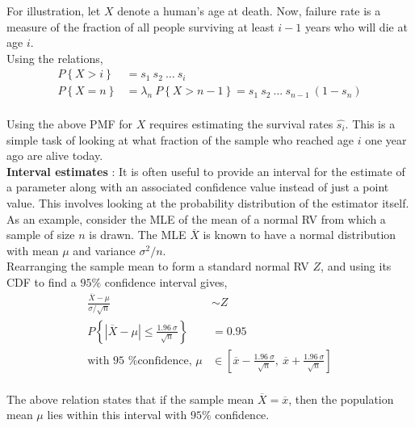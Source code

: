 For illustration, let $ X $ denote a human's age at death. Now, failure rate is a measure of the fraction of all people surviving at least $ i-1 $ years who will die at age $ i $. \\

Using the relations, \\

\begin{align}
	P \left\{X > i\right\} &= s_1\ s_2\ \dots\ s_i \nonumber \\
	P\left\{X = n\right\} &= \lambda_n\ P \left\{X > n-1\right\} = s_1\ s_2\ \dots\ s_{n-1}\ (1 - s_n) 
\end{align}\\

Using the above PMF for $ X $ requires estimating the survival rates $ \widehat{s_i} $. This is a simple task of looking at what fraction of the sample who reached age $ i $ one year ago are alive today.\\

\textbf{Interval estimates} : It is often useful to provide an interval for the estimate of a parameter along with an associated confidence value instead of just a point value. This involves looking at the probability distribution of the estimator itself. \\

As an example, consider the MLE of the mean of a normal RV from which a sample of size $ n $ is drawn. The MLE $ \overline{X} $ is known to have a normal distribution with mean $ \mu $ and variance $ \sigma^2 / n $. \\

Rearranging the sample mean to form a standard normal RV $ Z $, and using its CDF to find a $ 95\% $ confidence interval gives, \\

\begin{align}
	\frac{\overline{X} - \mu}{\sigma / \sqrt{n}} &\sim Z \nonumber \\
	P \left\{ | \overline{X} - \mu | \leq \frac{1.96\ \sigma}{\sqrt{n}} \right\} &= 0.95 \nonumber \\
	\text{with 95 \% confidence, } \mu &\in \left[ \overline{x} - \frac{1.96\ \sigma}{\sqrt{n}}, \ \overline{x} + \frac{1.96\ \sigma}{\sqrt{n}} \right]
\end{align}\\

The above relation states that if the sample mean $ \overline{X} = \overline{x} $, then the population mean $ \mu $ lies within this interval with $ 95\% $ confidence.\\

